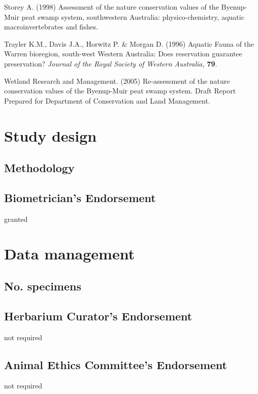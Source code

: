 \documentclass[version=last,
    paper=a4, %
    10pt, %
    usenames,
    dvipsnames,
    oneside, %
    headings=openany, %
    DIV=15 %
]{scrbook}
\begin{document}
Storey A. (1998) Assessment of the nature conservation values of the
Byenup-Muir peat swamp system, southwestern Australia:
physico-chemistry, aquatic macroinvertebrates and fishes.

Trayler K.M., Davis J.A., Horwitz P. \& Morgan D. (1996) Aquatic Fauna
of the Warren bioregion, south-west Western Australia: Does reservation
guarantee preservation? \emph{Journal of the Royal Society of Western
Australia,} \textbf{79}.

Wetland Research and Management. (2005) Re-assessment of the nature
conservation values of the Byenup-Muir peat swamp system. Draft Report
Prepared for Department of Conservation and Land Management.



\section*{Study design}

\subsection*{Methodology}




\subsection*{Biometrician's Endorsement}
granted



\section*{Data management}

\subsection*{No. specimens}




\subsection*{Herbarium Curator's Endorsement}
not required



\subsection*{Animal Ethics Committee's Endorsement}
not required
\end{document}
